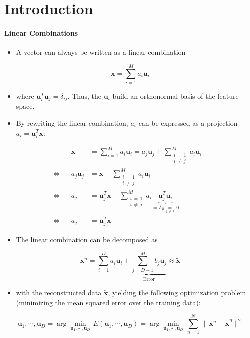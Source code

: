 \documentclass[a4paper, 11pt, accentcolor = tud3b]{tudreport}
\renewcommand{\vec}[1]{\mathbf{#1}}
\begin{document}
		\section{Introduction}
			\paragraph{Linear Combinations}
				\begin{itemize}
					\item A vector can always be written as a linear combination
				\end{itemize}
				\begin{equation}
					\vec{x} = \sum_{i = 1}^{M} a_i \vec{u}_i
				\end{equation}
				\begin{itemize}
					\item[] where \( \vec{u}_i^T \vec{u}_j = \delta_{ij} \). Thus, the \( \vec{u}_i \) build an orthonormal basis of the feature space.
					\item By rewriting the linear combination, \( a_i \) can be expressed as a projection \( a_i = \vec{u}_i^T \vec{x} \):
				\end{itemize}
				\begin{align}
					&& \vec{x} &= \sum_{i = 1}^{M} a_i \vec{u}_i = a_j \vec{u}_j + \sum_{\substack{i \,=\,  1 \\ i \,\neq\, j}}^{M} a_i \vec{u}_i & \\
					\iff && a_j \vec{u}_j &= \vec{x} - \sum_{\substack{i \,=\, 1 \\ i \,\neq\, j}}^{M} a_i \vec{u}_i & \\
					\iff && a_j &= \vec{u}_j^T \vec{x} - \sum_{\substack{i \,=\, 1 \\ i \,\neq\, j}}^{M} a_i \underbrace{\vec{u}_j^T \vec{u}_i}_{ =\, \delta_{ji} \underset{j \,\neq\, i}{=}\, 0 } & \\
					\iff && a_j &= \vec{u}_j^T \vec{x} &
				\end{align}
				\begin{itemize}
					\item The linear combination can be decomposed as
				\end{itemize}
				\begin{equation}
					\vec{x}^n = \sum_{i = 1}^{D} a_i \vec{u}_i + \underbrace{\sum_{j = D + 1}^{M} b_j \vec{u}_j}_\textrm{Error} \approx \tilde{\vec{x}}
				\end{equation}
				\begin{itemize}
					\item[] with the reconstructed data \(\tilde{\vec{x}}\), yielding the following optimization problem (minimizing the mean squared error over the training data):
				\end{itemize}
				\begin{equation}
					\vec{u}_1, \cdots, \vec{u}_D = \arg\min\limits_{\vec{u}_1, \cdots, \vec{u}_D} \, E(\vec{u}_1, \cdots, \vec{u}_D) = \arg\min\limits_{\vec{u}_1, \cdots, \vec{u}_D} \, \sum_{n = 1}^{N} \, \lVert \vec{x}^n - \tilde{\vec{x}}^n \rVert^2
				\end{equation}
\end{document}
